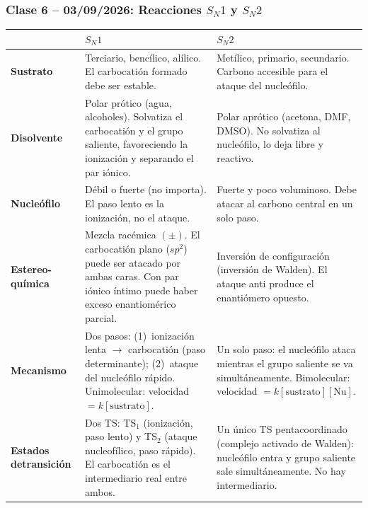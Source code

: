 {}
\subsubsection*{\textcolor{blueunam}{Clase 6 -- 03/09/2026: Reacciones $S_N1$ y $S_N2$}}

\begin{center}
\small
\renewcommand{\arraystretch}{1.6}
\setlength{\LTleft}{0pt}
\begin{longtable}{|p{2.5cm}|p{5cm}|p{5cm}|}
\hline
\rule{0pt}{14pt} & \textbf{$S_N1$} & \textbf{$S_N2$} \\
\hline
\endhead
\hline
\textbf{Sustrato} &
Terciario, bencílico, alílico. El carbocatión formado debe ser estable. &
Metílico, primario, secundario. Carbono accesible para el ataque del nucleófilo. \\
\hline
\textbf{Disolvente} &
Polar prótico (agua, alcoholes). Solvatiza el carbocatión y el grupo saliente,
favoreciendo la ionización y separando el par iónico. &
Polar aprótico (acetona, DMF, DMSO). No solvatiza al nucleófilo, lo deja libre y reactivo. \\
\hline
\textbf{Nucleófilo} &
Débil o fuerte (no importa). El paso lento es la ionización, no el ataque. &
Fuerte y poco voluminoso. Debe atacar al carbono central en un solo paso. \\
\hline
\textbf{Estereo-\linebreak química} &
Mezcla racémica $(\pm)$. El carbocatión plano ($sp^2$) puede ser atacado por ambas caras.
Con par iónico íntimo puede haber exceso enantiomérico parcial. &
Inversión de configuración (inversión de Walden). El ataque anti produce el enantiómero opuesto. \\
\hline
\textbf{Mecanismo} &
Dos pasos: (1)~ionización lenta $\rightarrow$ carbocatión (paso determinante);
(2)~ataque del nucleófilo rápido.
Unimolecular: velocidad $= k[\text{sustrato}]$. &
Un solo paso: el nucleófilo ataca mientras el grupo saliente se va simultáneamente.
Bimolecular: velocidad $= k[\text{sustrato}][\text{Nu}]$. \\
\hline
\textbf{Estados de\linebreak transición} &
Dos TS: TS$_1$ (ionización, paso lento) y TS$_2$ (ataque nucleofílico, paso rápido).
El carbocatión es el intermediario real entre ambos. &
Un único TS pentacoordinado (complejo activado de Walden): nucleófilo entra y grupo saliente
sale simultáneamente. No hay intermediario. \\
\hline
\end{longtable}
\normalsize
\end{center}


